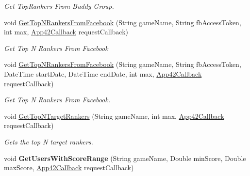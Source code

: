 \begin{DoxyCompactItemize}
\begin{DoxyCompactList}\small\item\em Get Top\+Rankers From Buddy Group. \end{DoxyCompactList}\item 
void \hyperlink{classcom_1_1shephertz_1_1app42_1_1paas_1_1sdk_1_1windows_1_1game_1_1_score_board_service_a75615fe1845ddee7a77401511f6e976d}{Get\+Top\+N\+Rankers\+From\+Facebook} (String game\+Name, String fb\+Access\+Token, int max, \hyperlink{interfacecom_1_1shephertz_1_1app42_1_1paas_1_1sdk_1_1windows_1_1_app42_callback}{App42\+Callback} request\+Callback)
\begin{DoxyCompactList}\small\item\em Get Top N Rankers From Facebook \end{DoxyCompactList}\item 
void \hyperlink{classcom_1_1shephertz_1_1app42_1_1paas_1_1sdk_1_1windows_1_1game_1_1_score_board_service_aa595d0b8f8a3250e69c0e6b3cc8f4830}{Get\+Top\+N\+Rankers\+From\+Facebook} (String game\+Name, String fb\+Access\+Token, Date\+Time start\+Date, Date\+Time end\+Date, int max, \hyperlink{interfacecom_1_1shephertz_1_1app42_1_1paas_1_1sdk_1_1windows_1_1_app42_callback}{App42\+Callback} request\+Callback)
\begin{DoxyCompactList}\small\item\em Get Top N Rankers From Facebook. \end{DoxyCompactList}\item 
void \hyperlink{classcom_1_1shephertz_1_1app42_1_1paas_1_1sdk_1_1windows_1_1game_1_1_score_board_service_a14ce72be3eab480e7207354650e140b8}{Get\+Top\+N\+Target\+Rankers} (String game\+Name, int max, \hyperlink{interfacecom_1_1shephertz_1_1app42_1_1paas_1_1sdk_1_1windows_1_1_app42_callback}{App42\+Callback} request\+Callback)
\begin{DoxyCompactList}\small\item\em Gets the top N target rankers. \end{DoxyCompactList}\item 
\hypertarget{classcom_1_1shephertz_1_1app42_1_1paas_1_1sdk_1_1windows_1_1game_1_1_score_board_service_a4aecb7e4b2477259b7044093e0e28bf4}{void {\bfseries Get\+Users\+With\+Score\+Range} (String game\+Name, Double min\+Score, Double max\+Score, \hyperlink{interfacecom_1_1shephertz_1_1app42_1_1paas_1_1sdk_1_1windows_1_1_app42_callback}{App42\+Callback} request\+Callback)}\label{classcom_1_1shephertz_1_1app42_1_1paas_1_1sdk_1_1windows_1_1game_1_1_score_board_service_a4aecb7e4b2477259b7044093e0e28bf4}


\end{DoxyCompactItemize}
